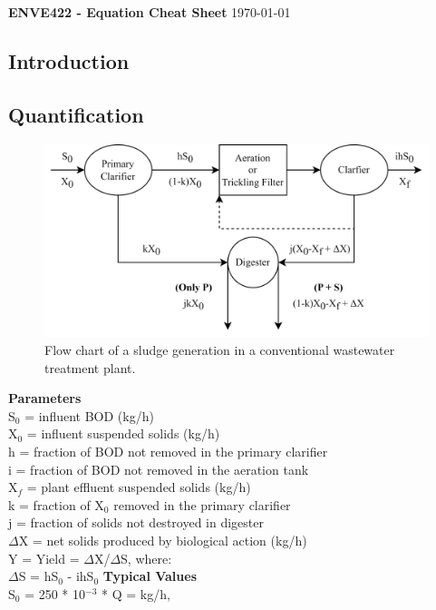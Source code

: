 \documentclass[a4paper, landscape]{article}
\begin{document}
\textbf{\LARGE ENVE422 - Equation Cheat Sheet} \hfill \today
\begin{multicols}{2}
\section*{Introduction}
\subsection*{Quantification}
\begin{figure}[H]
    \centering
    \includegraphics[scale = 1]{SludgeQuantities.png}
    \caption{Flow chart of a sludge generation in a conventional wastewater treatment plant.}
    \label{fig:sludge}
\end{figure}
\columnbreak
\begin{multicols}{2}
\null \vfill
\textbf{\large Parameters}\\
S$_0$ = influent BOD (kg/h)\\
X$_0$ = influent suspended solids (kg/h)\\
h = fraction of BOD not removed in the primary clarifier\\
i = fraction of BOD not removed in the aeration tank\\
X$_f$ = plant effluent suspended solids (kg/h)\\
k = fraction of X$_0$ removed in the primary clarifier\\
j = fraction of solids not destroyed in digester\\
$\Delta$X = net solids produced by biological action (kg/h)\\
Y = Yield = $\Delta$X/$\Delta$S, where:\\
$\Delta$S = hS$_0$ - ihS$_0$
\vfill \null
\columnbreak
\null \vfill
\textbf{\large Typical Values}\\
S$_0$ = 250 * 10$^{-3}$ * Q = kg/h,\\

\end{multicols}
\end{multicols}
\end{document}
